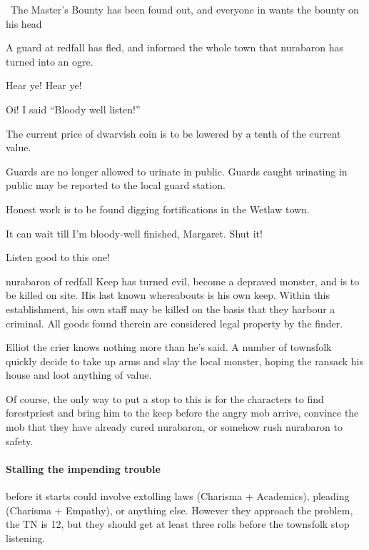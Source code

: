 \begin{multicols}{2}

{\N \N\ The Master's Bounty}%
{ has been found out, and everyone in  wants the bounty on his head}%

A guard at \gls{redfall} has fled, and informed the whole town that \gls{nurabaron} has turned into an ogre.

\begin{speechtext}

    Hear ye! Hear ye!

    Oi! I said ``Bloody well listen!''

    The current price of dwarvish coin is to be lowered by a tenth of the current value.

    Guards are no longer allowed to urinate in public.
    Guards caught urinating in public may be reported to the local guard station.

    Honest work is to be found digging fortifications in the Wetlaw town.

    It can wait till I'm bloody-well finished, Margaret.  Shut it!

    Listen good to this one!

    \gls{nurabaron} of \gls{redfall} Keep has turned evil, become a depraved monster, and is to be killed on site.  His last known whereabouts is his own keep.  Within this establishment, his own staff may be killed on the basis that they harbour a criminal.  All goods found therein are considered legal property by the finder.

\end{speechtext}

Elliot the crier knows nothing more than he's said.  A number of townsfolk quickly decide to take up arms and slay the local monster, hoping the ransack his house and loot anything of value.

Of course, the only way to put a stop to this is for the characters to find \gls{forestpriest} and bring him to the keep before the angry mob arrive, convince the mob that they have already cured \gls{nurabaron}, or somehow rush \gls{nurabaron} to safety.

\paragraph{Stalling the impending trouble}
before it starts could involve extolling laws (Charisma + Academics), pleading (Charisma + Empathy), or anything else.
However they approach the problem, the TN is 12, but they should get at least three rolls before the townsfolk stop listening.


\end{multicols}
